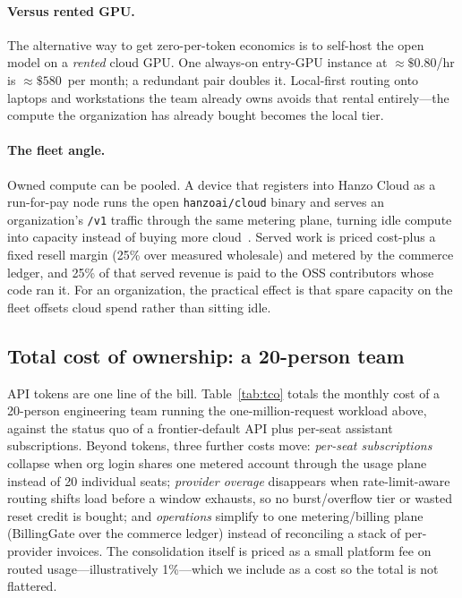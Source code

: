 \documentclass[11pt]{article}
\begin{document}
\paragraph{Versus rented GPU.} The alternative way to get zero-per-token
economics is to self-host the open model on a \emph{rented} cloud GPU. One
always-on entry-GPU instance at $\approx\$0.80$/hr is $\approx\$580$~per month; a
redundant pair doubles it. Local-first routing onto laptops and workstations the
team already owns avoids that rental entirely---the compute the organization has
already bought becomes the local tier.

\paragraph{The fleet angle.} Owned compute can be pooled. A device that
registers into Hanzo Cloud as a run-for-pay node runs the open
\texttt{hanzoai/cloud} binary and serves an organization's \texttt{/v1} traffic
through the same metering plane, turning idle compute into capacity instead of
buying more cloud~\cite{runforpay}. Served work is priced cost-plus a fixed
resell margin (25\% over measured wholesale) and metered by the commerce ledger,
and 25\% of that served revenue is paid to the OSS contributors whose code ran
it. For an organization, the practical effect is that spare capacity on the
fleet offsets cloud spend rather than sitting idle.

\subsection{Total cost of ownership: a 20-person team}
\label{sec:tco}

API tokens are one line of the bill. Table~\ref{tab:tco} totals the monthly cost
of a 20-person engineering team running the one-million-request workload above,
against the status quo of a frontier-default API plus per-seat assistant
subscriptions. Beyond tokens, three further costs move: \emph{per-seat
subscriptions} collapse when org login shares one metered account through the
usage plane instead of 20 individual seats; \emph{provider overage} disappears
when rate-limit-aware routing shifts load before a window exhausts, so no
burst/overflow tier or wasted reset credit is bought; and \emph{operations}
simplify to one metering/billing plane (BillingGate over the commerce ledger)
instead of reconciling a stack of per-provider invoices. The consolidation
itself is priced as a small platform fee on routed usage---illustratively
1\%---which we include as a cost so the total is not flattered.
\end{document}
